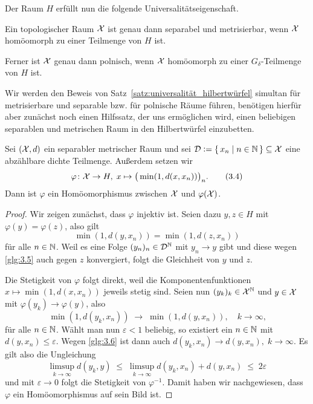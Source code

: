 \documentclass[../thesis/thesis.tex]{subfiles}
\begin{document}
	Der Raum $H$ erfüllt nun die folgende Universalitätseigenschaft.
	
	\begin{Satz}
		\label{satz:universalität_hilbertwürfel}
		Ein topologischer Raum $\mathcal{X}$ ist genau dann separabel und metrisierbar, wenn $\mathcal{X}$ homöomorph zu einer Teilmenge von $H$ ist.
		
		Ferner ist $\mathcal{X}$ genau dann polnisch, wenn $\mathcal{X}$ homöomorph zu einer $G_\delta$-Teilmenge von $H$ ist.
	\end{Satz}
	
	Wir werden den Beweis von Satz~\ref{satz:universalität_hilbertwürfel} simultan für metrisierbare und 
	separable bzw. für polnische Räume führen, benötigen hierfür aber zunächst noch einen Hilfssatz, der uns ermöglichen wird, 
	einen beliebigen separablen und metrischen Raum in den Hilbertwürfel einzubetten.
	
	\begin{Hilfssatz}
		\label{hilfssatz:einbettung_hilbertwürfel}
		Sei $(\mathcal{X}, d)$ ein separabler metrischer Raum und sei 
		$\mathcal{D} \vcentcolon = \left\{\, x_n \; \middle| \; n \in \mathbb{N} \,\right\} \subseteq \mathcal{X}$ eine abzählbare 
		dichte Teilmenge. Außerdem setzen wir
		\[\varphi \colon \mathcal{X} \to H, \; x \mapsto \big(\min (1, d(x, x_n)) \big)_n  \text{.} \label{glg:3.4} \tag{3.4}\]
		Dann ist $\varphi$ ein Homöomorphismus zwischen $\mathcal{X}$ und $\varphi(\mathcal{X})$.
	\end{Hilfssatz}
	
	\begin{proof}
		Wir zeigen zunächst, dass $\varphi$ injektiv ist. 
		Seien dazu $y, z \in H$ mit $\varphi(y) = \varphi(z)$, also gilt
		\[\min (1, d(y, x_n)) = \min (1, d(z, x_n)) \label{glg:3.5} \tag{3.5}\]
		für alle $n \in \mathbb{N}$. Weil es eine Folge $(y_n)_n \in \mathcal{D}^{\mathbb{N}}$ mit 
		$y_n \to y$ gibt und diese wegen \eqref{glg:3.5} auch gegen $z$ 
		konvergiert, folgt die Gleichheit von $y$ und $z$.
		
		Die Stetigkeit von $\varphi$ folgt direkt, weil die 
		Komponentenfunktionen $x \mapsto \min (1, d(x, x_n))$ jeweils stetig sind. 
		Seien nun $(y_k)_k \in \mathcal{X}^{\mathbb{N}}$ und $y \in \mathcal{X}$ mit $\varphi(y_k) \to \varphi(y)$, 
		also
		\[\min (1, d(y_k, x_n)) \; \to \; \min (1, d(y, x_n)), 
		\quad k \to \infty \text{,} \label{glg:3.6} \tag{3.6}\]
		für alle $n \in \mathbb{N}$. Wählt man nun $\varepsilon < 1$ beliebig, 
		so existiert ein $n \in \mathbb{N}$ mit $d(y, x_n) \leq \varepsilon$. 
		Wegen \eqref{glg:3.6} ist dann auch
		$d(y_k, x_n) \to d(y, x_n), \; k \to \infty$. Es gilt also die Ungleichung
		$$\limsup_{k \to \infty} d(y_k, y) \; \leq \; 
		\limsup_{k \to \infty} d(y_k, x_n) + d(y, x_n) \; \leq \; 2\varepsilon$$
		und mit $\varepsilon \to 0$ folgt die Stetigkeit von $\varphi^{-1}$. 
		Damit haben wir nachgewiesen, dass $\varphi$ ein Homöomorphismus auf sein Bild ist. 
	\end{proof}
\end{document}
